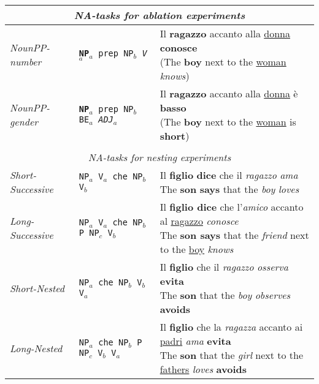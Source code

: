 \begin{table}[h]
    \setlength\tabcolsep{3mm}
\small
\centering
\begin{tabular}{lll}
\multicolumn{3}{c}{\centering \textit{NA-tasks for ablation experiments}}\\
\hline
\hline
\emph{NounPP-number} & \texttt{\textbf{NP$_a$} prep NP$_b$ \emph{V$_a$}} & \specialcell{Il \textbf{ragazzo} accanto alla \underline{donna} \textbf{conosce}\vspace{-1mm}\\({\scriptsize The \textbf{boy} next to the \underline{woman} \emph{knows}})} \\
\emph{NounPP-gender} & \texttt{\textbf{NP$_a$} prep NP$_b$ BE$_a$ \emph{ADJ$_a$}} & \specialcell{Il \textbf{ragazzo} accanto alla \underline{donna} \`{e} \textbf{basso}\vspace{-1mm}\\({\scriptsize The \textbf{boy} next to the \underline{woman} is \textbf{short}})}\\
\vspace{-2mm}\\
\multicolumn{3}{c}{\centering \textit{NA-tasks for nesting experiments}}\\
\hline
\hline
\emph{Short-Successive} & \texttt{NP$_a$ V$_a$ che NP$_b$ V$_b$} & \specialcell{Il \textbf{figlio} \textbf{dice} che il \emph{ragazzo} \emph{ama}\vspace{-1mm}\\{\scriptsize The \textbf{son} \textbf{says} that the \emph{boy} \emph{loves}}} \\
\emph{Long-Successive} & \texttt{NP$_a$ V$_a$ che NP$_b$ P NP$_c$ V$_b$} & \specialcell{Il \textbf{figlio dice} che l'\emph{amico} accanto al \underline{ragazzo} \emph{conosce}\vspace{-1mm}\\{\scriptsize The \textbf{son says} that the \emph{friend} next to the \underline{boy} \emph{knows}}} \\
\emph{Short-Nested} & \texttt{NP$_a$ che NP$_b$ V$_b$ V$_a$ } & \specialcell{Il \textbf{figlio} che il \emph{ragazzo} \emph{osserva} \textbf{evita}\vspace{-1mm}\\{\scriptsize The \textbf{son} that the \emph{boy} \emph{observes} \textbf{avoids}}} \\
\emph{Long-Nested} & \texttt{NP$_a$ che NP$_b$ P NP$_c$ V$_b$ V$_a$} & \specialcell{Il \textbf{figlio} che la \emph{ragazza} accanto ai \underline{padri} \emph{ama} \textbf{evita}\vspace{-1mm}\\{\scriptsize The \textbf{son} that the \emph{girl} next to the \underline{fathers} \emph{loves} \textbf{avoids}}} \\

\end{tabular}
\end{table}
